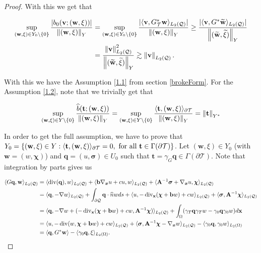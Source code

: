 \begin{proof}
    With this we get that

    \begin{align*}
        \sup_{(\mathbf{w},\xi)\in Y_0\setminus\{0\}}\frac{|b_0(\mathbf{v};(\mathbf{w},\xi))|}{\left\lVert(\mathbf{w},\xi) \right\rVert_Y}&=\sup_{(\mathbf{w},\xi)\in Y_0\setminus\{0\}}\frac{|\langle \mathbf{v} , G^*_{\mathcal{T}}\mathbf{w} \rangle_{L_2(\mathcal{Q})}|}{\left\lVert(\mathbf{w},\xi) \right\rVert_Y}\geq\frac{|\langle \mathbf{v} , G^*\widetilde{\mathbf{w}} \rangle_{L_2(\mathcal{Q})}|}{\left\lVert(\widetilde{\mathbf{w}},\widetilde{\xi}) \right\rVert_Y}\\&=\frac{\left\lVert\mathbf{v} \right\rVert^2_{L_2(\mathcal{Q})}}{\left\lVert(\widetilde{\mathbf{w}},\widetilde{\xi}) \right\rVert_Y}\gtrsim \left\lVert\mathbf{v} \right\rVert_{L_2(\mathcal{Q})}.    
    \end{align*}

    With this we have the Assumption \ref{1.1} from section \ref{brokeForm}. For the Assumption \ref{1.2}, note that we trivially get that

    $$\sup_{(\mathbf{w},\xi)\in Y\setminus\{0\}}\frac{\widehat{b}(\mathbf{t};(\mathbf{w},\xi))}{\left\lVert(\mathbf{w},\xi) \right\rVert_Y}=\sup_{(\mathbf{w},\xi)\in Y\setminus\{0\}}\frac{\langle \mathbf{t} , (\mathbf{w},\xi) \rangle_{\partial\mathcal{T}}}{\left\lVert(\mathbf{w},\xi) \right\rVert_Y}=\left\lVert\mathbf{t} \right\rVert_{Y^*}$$

    In order to get the full assumption, we have to prove that $Y_0=\{(\mathbf{w},\xi)\in Y: \langle \mathbf{t} , (\mathbf{w},\xi) \rangle_{\partial\mathcal{T}}=0, \text{ for all }\mathbf{t}\in\Gamma(\partial\mathcal{T})\}$. Let $(\mathbf{w},\xi)\in Y_0$ (with $\mathbf{w}=(w,\boldsymbol{\chi})$) and $\mathbf{q}=(u,\boldsymbol{\sigma})\in U_0$ such that $\mathbf{t}=\gamma_G\mathbf{q}\in \Gamma(\partial\mathcal{T})$. Note that integration by parts gives us

    \begin{align*}
        \langle G\mathbf{q} , \mathbf{w} \rangle_{L_2(\mathcal{Q})}&=\langle \operatorname{div}(\mathbf{q}) , w \rangle_{L_2(\mathcal{Q})}+\langle \mathbf{b}\nabla_{\boldsymbol{x}} u+cu , w \rangle_{L_2(\mathcal{Q})}+\langle \mathbf{A}^{-1}\boldsymbol{\sigma}+\nabla_{\boldsymbol{x}} u , \boldsymbol{\chi} \rangle_{L_2(\mathcal{Q})}\\&=\langle \mathbf{q} , -\nabla w \rangle_{L_2(\mathcal{Q})}+\int_{\partial\mathcal{Q}}\mathbf{q}\cdot\widehat{n}wds+\langle u , -\operatorname{div}_{\mathbf{x}}(\boldsymbol{\chi}+\mathbf{b}w)+cw \rangle_{L_2(\mathcal{Q})}+\langle \boldsymbol{\sigma} , \mathbf{A}^{-1}\boldsymbol{\chi} \rangle_{L_2(\mathcal{Q})}\\&=\langle \mathbf{q} , -\nabla w+(-\operatorname{div}_{\mathbf{x}}(\boldsymbol{\chi}+\mathbf{b}w)+cw,\mathbf{A}^{-1}\boldsymbol{\chi}) \rangle_{L_2(\mathcal{Q})}+\int_\Omega(\gamma_T\mathbf{q}\gamma_Tw-\gamma_0\mathbf{q}\gamma_0w)d\mathbf{x}\\&=\langle u , -\operatorname{div}(w,\boldsymbol{\chi}+\mathbf{b}w)+cw \rangle_{L_2(\mathcal{Q})}+\langle \boldsymbol{\sigma} , \mathbf{A}^{-1}\boldsymbol{\chi}-\nabla_{\boldsymbol{x}} w \rangle_{L_2(\mathcal{Q})}-\langle \gamma_0\mathbf{q} , \gamma_0w \rangle_{L_2(\Omega)}\\&=\langle \mathbf{q} , G^*\mathbf{w} \rangle-\langle \gamma_0\mathbf{q} , \xi \rangle_{L_2(\Omega)}.
    \end{align*}


\end{proof}
